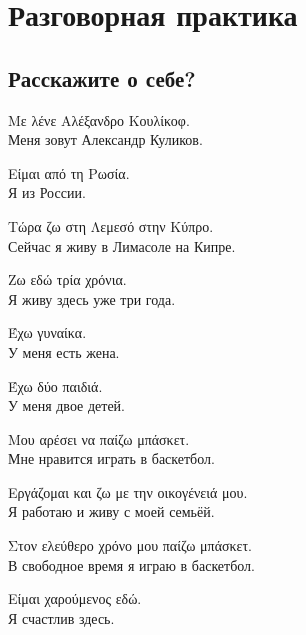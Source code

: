 \documentclass[12pt]{article}
\newcommand{\my}[1]{\textcolor{gray!80!white}{#1}}
\newenvironment{page}{\clearpage\normalsize\null\vfill}{\vfill\null}
\newenvironment{textblock}{\begin{minipage}{\textwidth}}{\end{minipage}\smallskip}
\begin{document}
	\begin{page}
		\section{Разговорная практика}
		\subsection{Расскажите о себе?}
		\small
		\begin{textblock}
			Με λένε Αλέξανδρο Κουλίκοφ.\\
			\my{Меня зовут Александр Куликов.}
			
			Είμαι από τη Ρωσία.\\
			\my{Я из России.}
			
			Τώρα ζω στη Λεμεσό στην Κύπρο.\\
			\my{Сейчас я живу в Лимасоле на Кипре.}
			
			Ζω εδώ τρία χρόνια.\\
			\my{Я живу здесь уже три года.}
			
			Έχω γυναίκα.\\
			\my{У меня есть жена.}
			
			Έχω δύο παιδιά.\\
			\my{У меня двое детей.}
			
			Μου αρέσει να παίζω μπάσκετ.\\
			\my{Мне нравится играть в баскетбол.}
			
			Εργάζομαι και ζω με την οικογένειά μου.\\
			\my{Я работаю и живу с моей семьёй.}
			
			Στον ελεύθερο χρόνο μου παίζω μπάσκετ.\\
			\my{В свободное время я играю в баскетбол.}
			
			Είμαι χαρούμενος εδώ.\\
			\my{Я счастлив здесь.}
		\end{textblock}
	\end{page}
	
\end{document}
